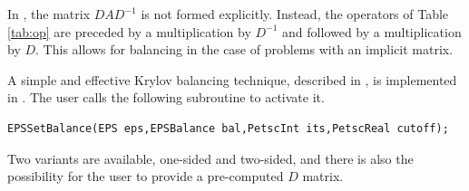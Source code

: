In \slepc, the matrix $DAD^{-1}$ is not formed explicitly. Instead, the operators of Table \ref{tab:op} are preceded by a multiplication by $D^{-1}$ and followed by a multiplication by $D$. This allows for balancing in the case of problems with an implicit matrix.

A simple and effective Krylov balancing technique, described in \citep{Chen:2000:BSM}, is implemented in \slepc. The user calls the following subroutine to activate it.
	\begin{Verbatim}[fontsize=\small]
	EPSSetBalance(EPS eps,EPSBalance bal,PetscInt its,PetscReal cutoff);
	\end{Verbatim}
Two variants are available, one-sided and two-sided, and there is also the possibility for the user to provide a pre-computed $D$ matrix.

